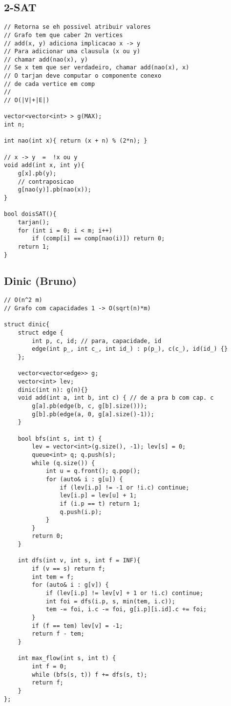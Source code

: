 \documentclass[12pt, a4paper, twoside]{article}
\begin{document}
\subsection{2-SAT}
\begin{lstlisting}
// Retorna se eh possivel atribuir valores
// Grafo tem que caber 2n vertices
// add(x, y) adiciona implicacao x -> y
// Para adicionar uma clausula (x ou y)
// chamar add(nao(x), y)
// Se x tem que ser verdadeiro, chamar add(nao(x), x)
// O tarjan deve computar o componente conexo
// de cada vertice em comp
//
// O(|V|+|E|)

vector<vector<int> > g(MAX);
int n;

int nao(int x){ return (x + n) % (2*n); }

// x -> y  =  !x ou y
void add(int x, int y){
	g[x].pb(y);
	// contraposicao
	g[nao(y)].pb(nao(x));
}

bool doisSAT(){
	tarjan();
	for (int i = 0; i < m; i++)
		if (comp[i] == comp[nao(i)]) return 0;
	return 1;
}
\end{lstlisting}

\subsection{Dinic (Bruno)}
\begin{lstlisting}
// O(n^2 m)
// Grafo com capacidades 1 -> O(sqrt(n)*m)

struct dinic{
	struct edge {
		int p, c, id; // para, capacidade, id
		edge(int p_, int c_, int id_) : p(p_), c(c_), id(id_) {}
	};

	vector<vector<edge>> g;
	vector<int> lev;
	dinic(int n): g(n){}
	void add(int a, int b, int c) { // de a pra b com cap. c
		g[a].pb(edge(b, c, g[b].size()));
		g[b].pb(edge(a, 0, g[a].size()-1));
	}

	bool bfs(int s, int t) {
		lev = vector<int>(g.size(), -1); lev[s] = 0;
		queue<int> q; q.push(s);
		while (q.size()) {
			int u = q.front(); q.pop();
			for (auto& i : g[u]) {
				if (lev[i.p] != -1 or !i.c) continue;
				lev[i.p] = lev[u] + 1;
				if (i.p == t) return 1;
				q.push(i.p);
			}
		}
		return 0;
	}

	int dfs(int v, int s, int f = INF){
		if (v == s) return f;
		int tem = f;
		for (auto& i : g[v]) {
			if (lev[i.p] != lev[v] + 1 or !i.c) continue;
			int foi = dfs(i.p, s, min(tem, i.c));
			tem -= foi, i.c -= foi, g[i.p][i.id].c += foi;
		}
		if (f == tem) lev[v] = -1;
		return f - tem;
	}

	int max_flow(int s, int t) {
		int f = 0;
		while (bfs(s, t)) f += dfs(s, t);
		return f;
	}
};


\end{lstlisting}
\end{document}
